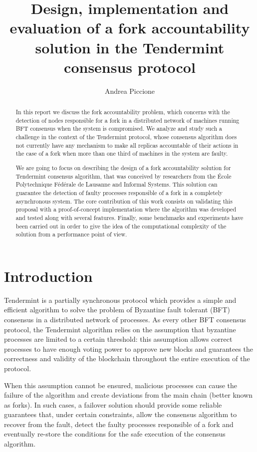 \documentclass[a4paper,11pt,oneside]{report}
\title{Design, implementation and evaluation of a fork accountability\\solution in the Tendermint consensus protocol}
\author{Andrea Piccione}
\begin{document}
\maketitle

\begin{abstract}

In this report we discuss the fork accountability problem, which concerns with the detection of nodes responsible for a fork in a distributed network of machines running BFT consensus when the system is compromised. We analyze and study such a challenge in the context of the Tendermint protocol, whose consensus algorithm does not currently have any mechanism to make all replicas accountable of their actions in the case of a fork when more than one third of machines in the system are faulty.

We are going to focus on describing the design of a fork accountability solution for Tendermint consensus algorithm, that was conceived by researchers from the École Polytechnique Fédérale de Lausanne and Informal Systems. This solution can guarantee the detection of faulty processes responsible of a fork in a completely asynchronous system. The core contribution of this work consists on validating this proposal with a proof-of-concept implementation where the algorithm was developed and tested along with several features. Finally, some benchmarks and experiments have been carried out in order to give the idea of the computational complexity of the solution from a performance point of view.

\end{abstract}

\maketoc

\chapter{Introduction}

Tendermint is a partially synchronous protocol which provides a simple and efficient algorithm to solve the problem of Byzantine fault tolerant (BFT) consensus in a distributed network of processes. As every other BFT consensus protocol, the Tendermint algorithm relies on the assumption that byzantine processes are limited to a certain threshold: this assumption allows correct processes to have enough voting power to approve new blocks and guarantees the correctness and validity of the blockchain throughout the entire execution of the protocol. 

When this assumption cannot be ensured, malicious processes can cause the failure of the algorithm and create deviations from the main chain (better known as forks). In such cases, a failover solution should provide some reliable guarantees that, under certain constraints, allow the consensus algorithm to recover from the fault, detect the faulty processes responsible of a fork and eventually re-store the conditions for the safe execution of the consensus algorithm.        
\end{document}
